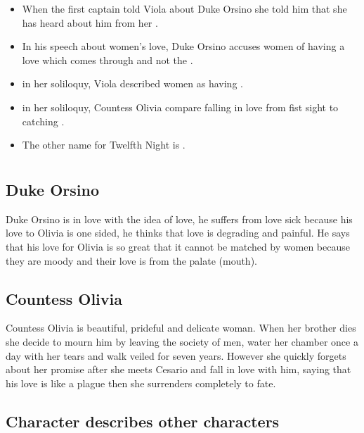 \documentclass[12pt, a4paper]{article}
\begin{document}
\begin{itemize}
  \item[\ding{99}] When the first captain told Viola about Duke Orsino she told him that she has heard about him from her .

  \item[\ding{99}] In his speech about women's love, Duke Orsino accuses women of having a love which comes through  and not the .

  \item[\ding{99}] in her soliloquy, Viola described women as having .

  \item[\ding{99}] in her soliloquy, Countess Olivia compare falling in love from fist sight to catching .

  \item[\ding{99}] The other name for Twelfth Night is .

\end{itemize}

\section*{}

\subsection*{Duke Orsino}

Duke Orsino is in love with the idea of love, he suffers from love sick because
his love to Olivia is one sided, he thinks that love is degrading and painful.
He says that his love for Olivia is so great that it cannot be matched by women
because they are moody and their love is from the palate (mouth).

\subsection*{Countess Olivia}

Countess Olivia is beautiful, prideful and delicate woman. When her brother 
dies she decide to mourn him by leaving the society of men, water 
her chamber once a day with her tears and walk veiled for seven years. However
she quickly forgets about her promise after she meets Cesario and fall in love
with him, saying that his love is like a plague then she surrenders completely to fate.


\subsection*{Character describes other characters}
\end{document}
